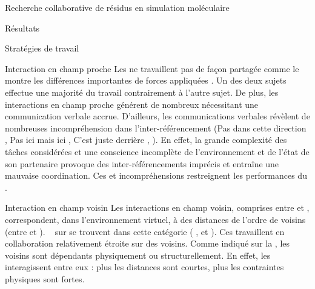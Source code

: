 \documentclass[myfrancais]{mythesis}
\begin{document}
\begin{mychapter}{Recherche collaborative de résidus en simulation moléculaire}
\begin{mysection}{Résultats}
\begin{mysubsection}{Stratégies de travail}
\begin{mysubsubsection}{Interaction en champ proche}
					Les  ne travaillent pas de façon partagée comme le montre les différences importantes de forces appliquées .
					Un des deux sujets effectue une majorité du travail contrairement à l'autre sujet.
					De plus, les interactions en champ proche générent de nombreux  nécessitant une communication verbale accrue.
					D'ailleurs, les communications verbales révèlent de nombreuses incompréhension dans l'inter-référencement (\og Pas dans cette direction \fg, \og Pas ici mais ici \fg, \og C'est juste derrière \fg, \myetc).
					En effet, la grande complexité des tâches considérées et une conscience incomplète de l'environnement et de l'état de son partenaire provoque des inter-référencements imprécis et entraîne une mauvaise coordination.
					Ces  et incompréhensions restreignent les performances du .
				\end{mysubsubsection}
				\begin{mysubsubsection}{Interaction en champ voisin}
					Les interactions en champ voisin, comprises entre  et , correspondent, dans l'environnement virtuel, à des distances de l'ordre de  voisins (entre  et ).
					~ sur  se trouvent dans cette catégorie ( ,  et ).
					Ces  travaillent en collaboration relativement étroite sur des  voisins.
					Comme indiqué sur la , les  voisins sont dépendants physiquement ou structurellement.
					En effet, les  interagissent entre eux : plus les distances sont courtes, plus les contraintes physiques sont fortes.


\end{mysubsubsection}
\end{mysubsection}
\end{mysection}
\end{mychapter}
\end{document}
